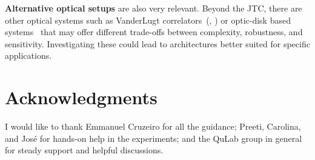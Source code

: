 \documentclass[twocolumn]{article} %
\begin{document}
\textbf{Alternative optical setups} are also very relevant. Beyond the JTC, there are other optical systems such as VanderLugt correlators~(\cite{VanderLugt1964}, \cite{Dragulinescu2023}) or optic-disk based systems~\cite{Neifeld1993} that may offer different trade-offs between complexity, robustness, and sensitivity. Investigating these could lead to architectures better suited for specific applications.

\section*{Acknowledgments}
I would like to thank Emmanuel Cruzeiro for all the guidance; Preeti, Carolina, and José for hands-on help in the experiments; and the QuLab group in general for steady support and helpful discussions.

{}

\end{document}
